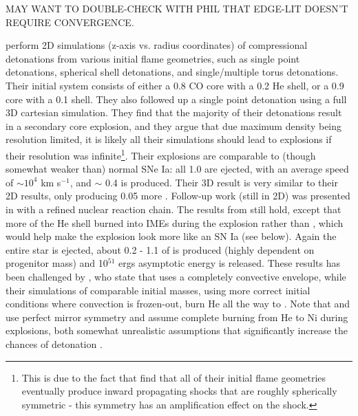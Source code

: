 MAY WANT TO DOUBLE-CHECK WITH PHIL THAT EDGE-LIT DOESN'T REQUIRE CONVERGENCE.

\cite{finkhr07} perform 2D simulations (z-axis vs. radius coordinates) of compressional detonations from various initial flame geometries, such as single point detonations, spherical shell detonations, and single/multiple torus detonations.  Their initial system consists of either a 0.8 {\Msun} CO core with a 0.2 {\Msun} He shell, or a  0.9 {\Msun} core with a 0.1 {\Msun} shell.  They also followed up a single point detonation using a full 3D cartesian simulation.  They find that the majority of their detonations result in a secondary core explosion, and they argue that due maximum density being resolution limited, it is likely all their simulations should lead to explosions if their resolution was infinite\footnote{This is due to the fact that \citeauthor{finkhr07} find that all of their initial flame geometries eventually produce inward propagating shocks that are roughly spherically symmetric - this symmetry has an amplification effect on the shock.}.  Their explosions are comparable to (though somewhat weaker than) normal SNe Ia: all 1.0 {\Msun} are ejected, with an average speed of $\sim 10^4$ km s$^{-1}$, and $\sim$ 0.4 {\Msun} {\Ni} is produced.  Their 3D result is very similar to their 2D results, only producing 0.05 {\Msun} more {\Ni}.  Follow-up work (still in 2D) was presented in \cite{fink+10} with a refined nuclear reaction chain.  The results from \cite{finkhr07} still hold, except that more of the He shell burned into IMEs during the explosion rather than {\Ni}, which would help make the explosion look more like an SN Ia (see below).  Again the entire star is ejected, about 0.2 - 1.1 {\Msun} of {\Ni} is produced (highly dependent on progenitor mass) and 10$^{51}$ ergs asymptotic energy is released.  These results has been challenged by \citeauthor{woosk10}, who state that \citeauthor{fink+10} uses a completely convective envelope, while their simulations of comparable initial masses, using more correct initial conditions where convection is frozen-out, burn He all the way to {\Ni}.  Note that \cite{finkhr07} and \cite{fink+10} use perfect mirror symmetry and assume complete burning from He to Ni during explosions, both somewhat unrealistic assumptions that significantly increase the chances of detonation \citep{guil+10}.

